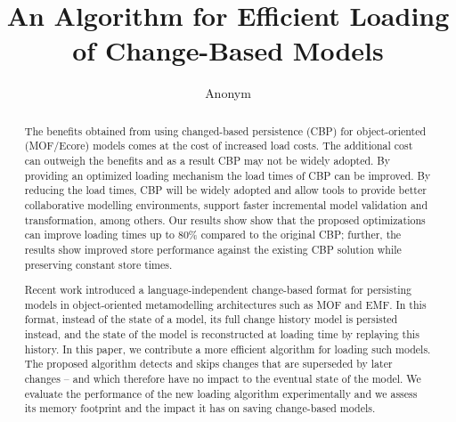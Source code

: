 \documentclass{llncs}
\begin{document}
\renewcommand{\thelstlisting}{\arabic{lstlisting}}
\renewcommand{\labelitemi}{$\bullet$}
\newcommand{\dk}[1]{\textbf{[DK: #1]}}

\title{An Algorithm for Efficient Loading \\ of Change-Based Models}
%
%
\author{
    Anonym%
}
%
%
%


\maketitle              %
\begin{abstract}
The benefits obtained from using changed-based persistence (CBP) for object-oriented (MOF/Ecore) models comes at the cost of increased load costs. The additional cost can outweigh the benefits and as a result CBP may not be widely adopted. By providing an optimized loading mechanism the load times of CBP can be improved. By reducing the load times, CBP will be widely adopted and allow tools to provide better collaborative modelling environments, support faster incremental model validation and transformation, among others. Our results show show that the proposed optimizations can improve loading times up to 80\% compared to the original CBP; further, the results show improved store performance against the existing CBP solution while preserving constant store times.

Recent work introduced a language-independent change-based format for persisting models in object-oriented metamodelling architectures such as MOF and EMF. In this format, instead of the state of a model, its full change history model is persisted instead, and the state of the model is reconstructed at loading time by replaying this history. In this paper, we contribute a more efficient algorithm for loading such models. The proposed algorithm detects and skips changes that are superseded by later changes -- and which therefore have no impact to the eventual state of the model. We evaluate the performance of the new loading algorithm experimentally and we assess its memory footprint and the impact it has on saving change-based models. 

\end{abstract}
\end{document}
